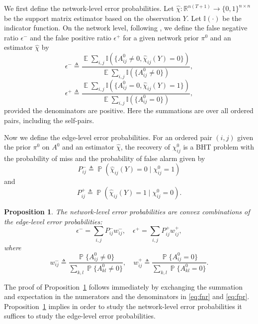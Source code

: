 \documentclass[conference,letterpaper]{IEEEtran}
\newcommand{\defeq}{\triangleq}
\newcommand{\reals}{\mathbb{R}}%
\renewcommand{\Pr}{\operatorname{\mathbb P}}%
\newcommand{\E}{\operatorname{\mathbb E}}%
\newtheorem{prop}{Proposition}
\newcommand{\indicator}[1]{\mathbb{I}(#1)}%
\newcommand{\trueAdjMat}{A^0}%
\newcommand{\edgeFNR}{P^-}%
\newcommand{\edgeFPR}{P^+}%
\newcommand{\fnrNet}{\epsilon^-}%
\newcommand{\fprNet}{\epsilon^+}%
\newcommand{\trueSuppMat}{\chi^0}%
\newcommand{\suppMatEst}{\widehat\chi}%
\begin{document}
We first define the network-level error probabilities.  Let
$\suppMatEst \colon\reals^{n(T+1)}\to\{0, 1\}^{n\times n}$ be the
support matrix estimator based on the observation $Y$.  Let
$\indicator{\cdot}$ be the indicator function.  On the network level,
following \cite{SunTaylorBollt15}, we define the false negative ratio
$\fnrNet$ and the false positive ratio $\fprNet$ for a given network
prior $\pi^0$ and an estimator $\suppMatEst$ by
\begin{equation}
  \label{eq:fnr}
  \fnrNet \defeq \frac{\E\sum_{i, j}\indicator{\{\trueAdjMat_{ij}\neq
      0, \suppMatEst_{ij}(Y) = 0\}}}{\E\sum_{i,
      j}\indicator{\{\trueAdjMat_{ij}\neq 0\}}},
\end{equation}
\begin{equation}
  \label{eq:fpr}
  \fprNet \defeq \frac{\E\sum_{i, j}\indicator{\{\trueAdjMat_{ij} = 0,
      \suppMatEst_{ij}(Y) = 1\}}}{\E\sum_{i,
      j}\indicator{\{\trueAdjMat_{ij} = 0\}}},
\end{equation}
provided the denominators are positive.  Here the summations are over
all ordered pairs, including the self-pairs.

Now we define the edge-level error probabilities.  For an ordered pair
$(i, j)$ given the prior $\pi^0$ on $\trueAdjMat$ and an estimator
$\suppMatEst$, the recovery of $\trueSuppMat_{ij}$ is a BHT problem
with the probability of miss and the probability of false alarm given
by
\begin{equation}
  \label{eq:fnr-edge}
  \edgeFNR_{ij} \defeq\Pr(\suppMatEst_{ij}(Y) = 0\mid\trueSuppMat_{ij} = 1)
\end{equation}
and
\begin{equation}
  \label{eq:fpr-edge}
  \edgeFPR_{ij}\defeq\Pr(\suppMatEst_{ij}(Y) = 1\mid\trueSuppMat_{ij} = 0).
\end{equation}
\begin{prop}
  \label{prop:network-edge}
  The network-level error probabilities are convex combinations of the
  edge-level error probabilities:
  \[\fnrNet = \sum_{i, j}\edgeFNR_{ij}w_{ij}^-,\quad\fprNet = \sum_{i,
      j}\edgeFPR_{ij}w_{ij}^+,\]
  where
  \[w_{ij}^- \defeq\frac{\Pr\{\trueAdjMat_{ij}\neq 0\}}{\sum_{k,
        l}\Pr\{\trueAdjMat_{kl}\neq 0\}},\quad w_{ij}^+\defeq
    \frac{\Pr\{\trueAdjMat_{ij} = 0\}}{\sum_{k,
        l}\Pr\{\trueAdjMat_{kl} = 0\}}.\]
\end{prop}
The proof of Proposition~\ref{prop:network-edge} follows immediately
by exchanging the summation and expectation in the numerators and the
denominators in \eqref{eq:fnr} and \eqref{eq:fpr}.
Proposition~\ref{prop:network-edge} implies in order to study the
network-level error probabilities it suffices to study the edge-level
error probabilities.
\end{document}
